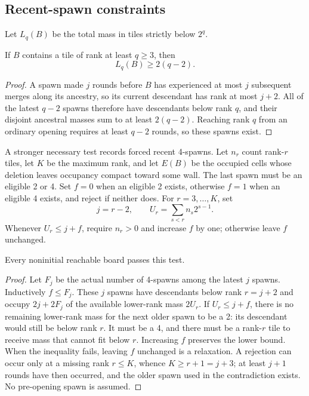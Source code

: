 \subsection{Recent-spawn constraints}

Let $L_q(B)$ be the total mass in tiles strictly below $2^q$.
\begin{lemma}\label{ss:latency}
If $B$ contains a tile of rank at least $q\ge3$, then
\[
 L_q(B)\ge2(q-2).
\]
\end{lemma}
\begin{proof}
A spawn made $j$ rounds before $B$ has experienced at most $j$
subsequent merges along its ancestry, so its current descendant has
rank at most $j+2$. All of the latest $q-2$ spawns therefore have
descendants below rank $q$, and their disjoint ancestral masses sum to
at least $2(q-2)$. Reaching rank $q$ from an ordinary opening requires
at least $q-2$ rounds, so these spawns exist.
\end{proof}

A stronger necessary test records forced recent 4-spawns. Let $n_r$
count rank-$r$ tiles, let $K$ be the maximum rank, and let $E(B)$ be the
occupied cells whose deletion leaves occupancy compact toward some wall.
The last spawn must be an eligible 2 or 4. Set $f=0$ when an eligible 2
exists, otherwise $f=1$ when an eligible 4 exists, and reject if neither
does. For $r=3,\ldots,K$, set
\[
 j=r-2,\qquad U_r=\sum_{s<r}n_s2^{s-1}.
\]
Whenever $U_r\le j+f$, require $n_r>0$ and increase $f$ by one;
otherwise leave $f$ unchanged.

\begin{lemma}\label{ss:causal}
Every noninitial reachable board passes this test.
\end{lemma}
\begin{proof}
Let $F_j$ be the actual number of 4-spawns among the latest $j$ spawns.
Inductively $f\le F_j$. These $j$ spawns have descendants below rank
$r=j+2$ and occupy $2j+2F_j$ of the available lower-rank mass $2U_r$.
If $U_r\le j+f$, there is no remaining lower-rank mass for the next
older spawn to be a 2: its descendant would still be below rank $r$.
It must be a 4, and there must be a rank-$r$ tile to receive mass that
cannot fit below $r$. Increasing $f$ preserves the lower bound.
When the inequality fails, leaving $f$ unchanged is a relaxation.
A rejection can occur only at a missing rank $r\le K$, whence
$K\ge r+1=j+3$; at least $j+1$ rounds have then occurred, and the older
spawn used in the contradiction exists. No pre-opening spawn is assumed.
\end{proof}

